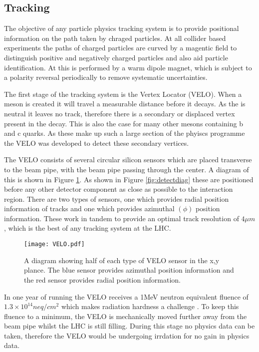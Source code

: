 \subsection{Tracking}
\label{sec:Tracking}
The objective of any particle physics tracking system is to provide positional information on the path taken by chraged particles.  At all collider based experiments the paths of charged particles are curved by a magentic field to distinguish positive and negatively charged particles and also aid particle identification.  At \lhcb this is performed by a warm dipole magnet, which is subject to a polarity reversal periodically to remove systematic uncertainties.

The first stage of the \lhcb tracking system is the Vertex Locator (VELO).  When a \Bd meson is created it will travel a measurable distance before it decays.  As the \Bd is neutral it leaves no track, therefore there is a secondary or displaced vertex present in the decay.  This is also the case for many other mesons containing b and c quarks.  As these make up such a large section of the \lhcb phyiscs programme the VELO was developed to detect these secondary vertices.

The VELO consists of several circular silicon sensors which are placed transverse to the beam pipe, with the beam pipe passing through the center.  A diagram of this is shown in Figure \ref{fig:VELO}.  As shown in Figure \ref{fig:detectdiag} these are positioned before any other detector component as close as possible to the interaction region.  There are two types of sensors, one which provides radial position information of tracks and one which provides azimuthal $(\phi)$ position information.  These work in tandem to provide an optimal track resolution of $4\mu m$ \cite{Aaij:1978280}, which is the best of any tracking system at the LHC.
\begin{figure}
  \centering
  \texttt{[image: VELO.pdf]}
  \caption{A diagram showing half of each type of VELO sensor in the x,y plance.  The blue sensor provides azimuthal position information and the red sensor provides radial position information.}
  \label{fig:VELO}
\end{figure}

 In one year of running the VELO receives a 1MeV neutron equivalent fluence of $1.3\times10^{14} neq/cm^2$ which makes radiation hardness a challenge \cite{Alves:1129809}.  To keep this fluence to a minimum, the VELO is mechanically moved further away from the beam pipe whilst the LHC is still filling.  During this stage no physics data can be taken, therefore the VELO would be undergoing irrdation for no gain in physics data.

